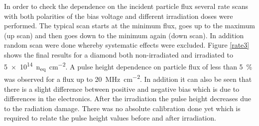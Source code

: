 
In order to check the dependence on the incident particle flux several rate scans with both polarities of the bias voltage and different irradiation doses were performed. The typical scan starts at the minimum flux, goes up to the maximum (up scan) and then goes down to the minimum again (down scan). In addition random scan were done whereby systematic effects were excluded. Figure \vref{rate3} shows the final results for a \pcvd diamond both non-irradiated and irradiated to \SI{5e14}{n_{eq}\per \centi\meter^2}. A pulse height dependence on particle flux of less than \SI{5}{\%} was observed for a flux up to \SI{20}{\mega\hertz\per cm^2}. In addition it can also be seen that there is a slight difference between positive and negative bias which is due to differences in the electronics. After the irradiation the pulse height decreases due to the radiation damage. There was no absolute calibration done yet which is required to relate the pulse height values before and after irradiation.

